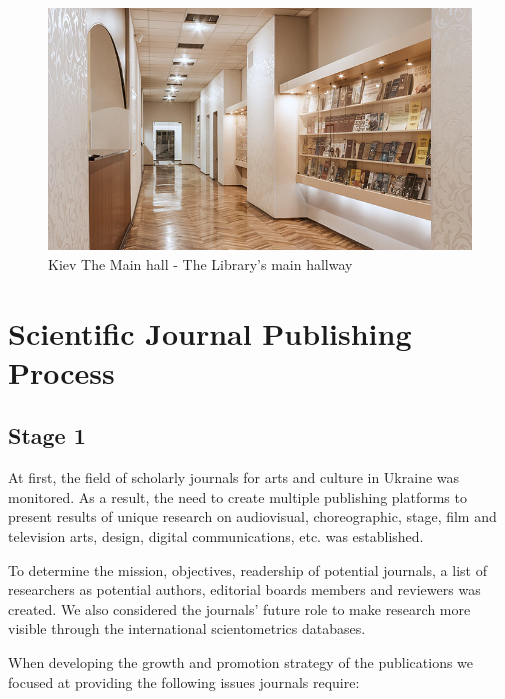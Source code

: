 \documentclass[a4paper,
fontsize=11pt,
oneside,
numbers=noperiodatend,
parskip=half-,
bibliography=totoc,
final
]{scrartcl}
\begin{document}
\begin{figure}
\centering
\includegraphics{img/abb_1.jpg}
\caption{Kiev The Main hall - The Library's main hallway}
\end{figure}

\hypertarget{scientific-journal-publishing-process}{%
\section{Scientific Journal Publishing
Process}\label{scientific-journal-publishing-process}}

\hypertarget{stage-1}{%
\subsection{Stage 1}\label{stage-1}}

At first, the field of scholarly journals for arts and culture in
Ukraine was monitored. As a result, the need to create multiple
publishing platforms to present results of unique research on
audiovisual, choreographic, stage, film and television arts, design,
digital communications, etc. was established.

To determine the mission, objectives, readership of potential journals,
a list of researchers as potential authors, editorial boards members and
reviewers was created. We also considered the journals' future role to
make research more visible through the international scientometrics
databases.

When developing the growth and promotion strategy of the publications we
focused at providing the following issues journals require:
\end{document}
